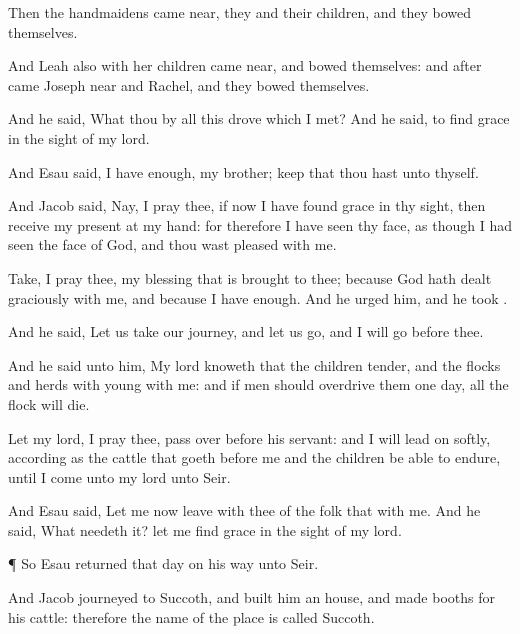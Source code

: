 {Then the
handmaidens came
near, they and their
children, and they bowed
themselves.

And
Leah also with her
children came
near, and bowed
themselves: and
after
came
Joseph
near and
Rachel, and they
bowed themselves.

And he
said, What
{} thou by all this
drove which I
met? And he
said,
{} to
find
grace in the
sight of my
lord.

And
Esau
said, I
have
enough, my
brother; keep that thou hast unto thyself.

And
Jacob
said, Nay, I pray thee, if now I have
found
grace in thy
sight, then
receive my
present at my
hand: for therefore I have
seen thy
face, as though I had
seen the
face of
God, and thou wast pleased with
me.

Take, I pray thee, my
blessing that is
brought to thee; because
God hath dealt graciously with
me, and
because I
have
enough. And he
urged him, and he
took
{}.

And he
said, Let us take our
journey, and let us
go, and I will
go before thee.

And he
said unto him, My
lord
knoweth that the
children
{}
tender, and the
flocks and
herds with
young
{} with me: and if men should
overdrive them
one
day, all the
flock will
die.

Let my
lord, I pray thee, pass
over
before his
servant: and I will lead
on
softly, according
as the
cattle that goeth before
me and the
children be able to
endure, until I
come unto my
lord unto
Seir.

And
Esau
said, Let me now
leave with thee
{} of the
folk that
{} with me. And he
said,
What needeth it? let me
find
grace in the
sight of my
lord.


\par }{\PP {}¶ So
Esau
returned that
day on his
way unto
Seir.

And
Jacob
journeyed to
Succoth, and
built him an
house, and
made
booths for his
cattle: therefore the
name of the
place is
called
Succoth.


}
